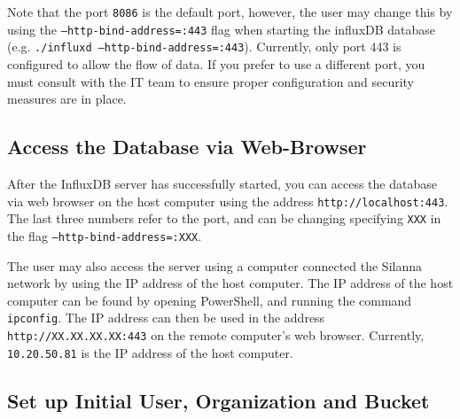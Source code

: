 \documentclass{article}
\begin{document}
\begin{enumerate}
    \noindent
    Note that the port \texttt{8086} is the default port, however, the user may change this by using the \texttt{--http-bind-address=:443} flag when starting the influxDB database (e.g. \texttt{./influxd --http-bind-address=:443}). Currently, only port 443 is configured to allow the flow of data. If you prefer to use a different port, you must consult with the IT team to ensure proper configuration and security measures are in place.
\end{enumerate}

\subsection{Access the Database via Web-Browser}
After the InfluxDB server has successfully started, you can access the database via web browser on the host computer using the address \texttt{http://localhost:443}. The last three numbers refer to the port, and can be changing specifying \texttt{XXX} in the flag \texttt{--http-bind-address=:XXX}.

\vspace{5pt}
\noindent
The user may also access the server using a computer connected the Silanna network by using the IP address of the host computer. The IP address of the host computer can be found by opening PowerShell, and running the command \texttt{ipconfig}. The IP address can then be used in the address \texttt{http://XX.XX.XX.XX:443} on the remote computer's web browser. Currently, \texttt{10.20.50.81} is the IP address of the host computer.

\subsection{Set up Initial User, Organization and Bucket}
\end{document}
